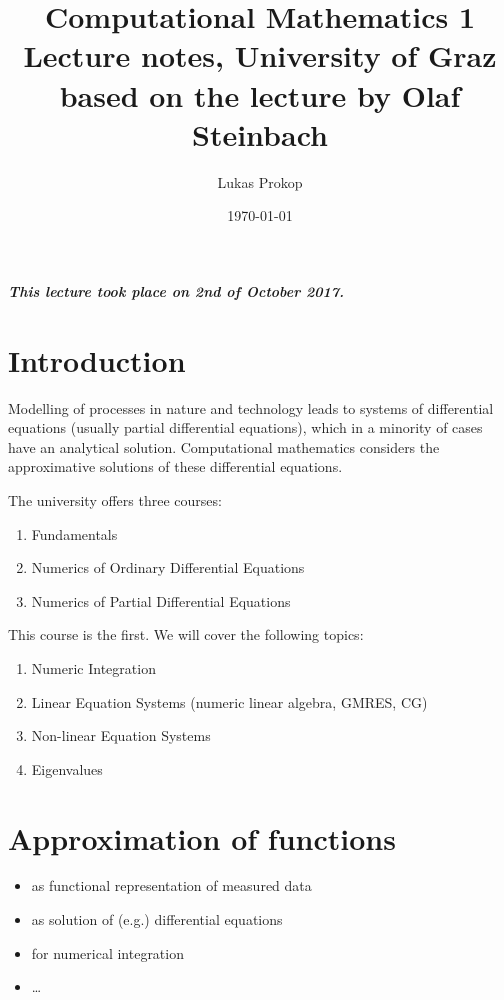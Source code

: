 \documentclass{article}
\title{
  Computational Mathematics 1 \\
  \large{Lecture notes, University of Graz} \\
  based on the lecture by Olaf Steinbach
}
\date{\today}
\author{Lukas Prokop}
\newcommand{\dateref}[1]{\paragraph{\textit{This lecture took place on #1.}}}
\begin{document}
\maketitle
\tableofcontents


\dateref{2nd of October 2017}

\section{Introduction}

Modelling of processes in nature and technology leads to systems
of differential equations (usually partial differential equations),
which in a minority of cases have an analytical solution.
Computational mathematics considers the approximative solutions
of these differential equations.

The university offers three courses:

\begin{enumerate}
  \item Fundamentals
  \item Numerics of Ordinary Differential Equations
  \item Numerics of Partial Differential Equations
\end{enumerate}

This course is the first.
We will cover the following topics:

\begin{enumerate}
  \item Numeric Integration
  \item Linear Equation Systems (numeric linear algebra, GMRES, CG)
  \item Non-linear Equation Systems
  \item Eigenvalues
\end{enumerate}

\section{Approximation of functions}

\begin{itemize}
  \item as functional representation of measured data
  \item as solution of (e.g.) differential equations
  \item for numerical integration
  \item \dots
\end{itemize}
\end{document}
